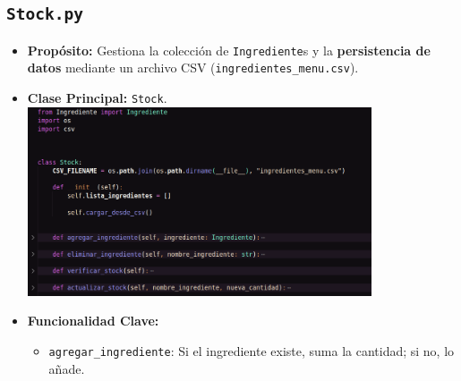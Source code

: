 \documentclass[a4paper, 12pt]{article}
\begin{document}
\subsection{\texttt{Stock.py}}
\begin{itemize}
    \item \textbf{Propósito:} Gestiona la colección de \texttt{Ingrediente}s y la \textbf{persistencia de datos} mediante un archivo CSV (\texttt{ingredientes\_menu.csv}).
    \item \textbf{Clase Principal:} \texttt{Stock}.\\
\includegraphics[width=0.8\textwidth]{images/5.png}
    \item \textbf{Funcionalidad Clave:}
    \begin{itemize}
    
        \begin{lstlisting}
            def agregar_ingrediente(self, ingrediente: Ingrediente):
        nombre_nuevo = ingrediente.nombre.strip().lower()
        for ing in self.lista_ingredientes:
            if str(ing.nombre).strip().lower() == nombre_nuevo:
                try:
                    ing.cantidad = float(ing.cantidad) + float(ingrediente.cantidad)
                except Exception:
                
                    try:
                        ing.cantidad = float(ingrediente.cantidad)
                    except Exception:
                        pass
                self.actualizar_csv()
                return True

        try:
            ingrediente.nombre = ingrediente.nombre.strip().capitalize()
        except Exception:
            pass
        self.lista_ingredientes.append(ingrediente)
        self.actualizar_csv()
        return True
        \end{lstlisting}
        
        \item \texttt{agregar\_ingrediente}: Si el ingrediente existe, suma la cantidad; si no, lo añade. 


\end{itemize}
\end{itemize}
\end{document}
